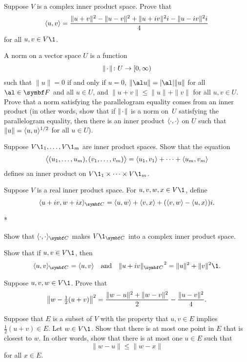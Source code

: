 \begin{exercises}
\exercise
Suppose $V$ is a complex inner product space. Prove that \label{202}
\[
\ip{u, v} =
\frac{\|u + v\|^2 - \|u - v\|^2 + \|u + iv\|^2 i - \|u -iv\|^2 i}{4}
\]
for all $u, v \in V\1$.


\exercise
A norm on a vector space $U$ is a function
\[
\norm{ \Cdot } \colon U \rightarrow [0, \infty)
\]
such that $\|u\| = 0$ if and only if
$u = 0$, $\|\al u\| = |\al| \|u\|$ for all
$\al \in \F{}$ and all $u \in U$, and $\|u + v\| \le \|u\| + \|v\|$ for all
$u, v \in U$.
Prove that a norm satisfying  the parallelogram equality comes from  an
inner product \big(in other words, show that if $\norm{\Cdot}$ is a norm  on~$U$
satisfying the parallelogram equality, then there is an inner product
$\ip{\cdot ,\cdot }$ on $U$ such that $\|u\| = \ip{u,u}^{1/2}$ for all
$u \in U$\big).


\exercise
Suppose $V\1_1, \dots, V\1_m$ are inner product spaces. Show that the equation
\[
\ip[\big]{(u_1, \dots, u_m), (v_1, \dots, v_m)} =
\ip{u_1, v_1} + \dots + \ip{u_m, v_m}
\]
defines an inner product on $V\1_1 \times \dots \times V\1_m$.


\exercise
Suppose $V$ is a real inner product space. For $u, v, w, x\in V\1$, define
\[
\ip{u+iv, w + ix}_{\C{}} = \ip{u,w} + \ip{v,x} + (\ip{v,w} - \ip{u,x})i.
\]
\begin{subtheorem}*
\item
Show that $\ip{\cdot, \cdot}_{\C{}}$ makes $V\1_{\C{}}$ into a complex inner product space.
\item
Show that if $u, v \in V\1$, then
\[
\ip{u, v}_{\C{}} = \ip{u, v} \andd {\norm{u + iv}_{\C{}}}^{2} = \norm{u}^2 + \norm{v}^2\1.
\]
\end{subtheorem}


\exercise
Suppose $u, v, w \in V\1$. Prove that\label{6wuv}
\[
\norm[\big]{w - \tfrac{1}{2}(u+v)}^2 = \frac{\|w-u\|^2 + \|w-v\|^2}{2} -\frac{\|u-v\|^2}{4}.
\vspace{-.05in}
\]


\exercise
Suppose that $E$ is a subset of $V$ with the property that $u , v \in E$ implies $\frac{1}{2}(u + v) \in E$. Let $w \in V\1$. Show that there is at most one point in $E$ that is closest to $w$. In other words, show that there is at most one $u \in E$ such that
\[
\|w - u\| \le \|w - x\|
\]
for all $x \in E$.



\end{exercises}
